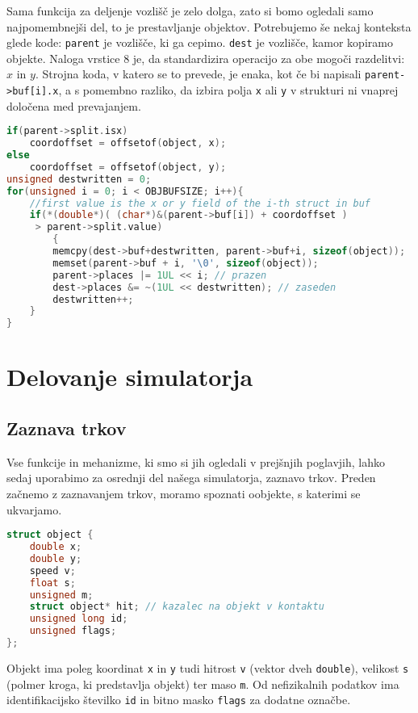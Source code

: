 \documentclass[a4paper,12pt]{article}
\begin{document}
Sama funkcija za deljenje vozlišč je zelo dolga, zato si bomo ogledali samo najpomembnejši
del, to je prestavljanje objektov. Potrebujemo še nekaj konteksta glede kode: \lstinline|parent|
je vozlišče, ki ga cepimo. \lstinline|dest| je vozlišče, kamor kopiramo objekte. Naloga vrstice
8 je, da standardizira operacijo za obe mogoči razdelitvi: $x$ in $y$. Strojna koda, v katero se to
prevede, je enaka, kot če bi napisali \lstinline|parent->buf[i].x|, a s pomembno razliko, da izbira
polja \lstinline|x| ali \lstinline|y| v strukturi ni vnaprej določena med prevajanjem.

\begin{lstlisting}[caption={Razdeljevanje objektov med potomcema}, label=balance_buffers, language=C]
if(parent->split.isx) 
    coordoffset = offsetof(object, x);
else 
    coordoffset = offsetof(object, y);
unsigned destwritten = 0;
for(unsigned i = 0; i < OBJBUFSIZE; i++){
    //first value is the x or y field of the i-th struct in buf
    if(*(double*)( (char*)&(parent->buf[i]) + coordoffset )
     > parent->split.value)
        {
        memcpy(dest->buf+destwritten, parent->buf+i, sizeof(object));
        memset(parent->buf + i, '\0', sizeof(object));
        parent->places |= 1UL << i; // prazen
        dest->places &= ~(1UL << destwritten); // zaseden
        destwritten++;
    }
}
\end{lstlisting}
\section{Delovanje simulatorja}
\subsection{Zaznava trkov}
Vse funkcije in mehanizme, ki smo si jih ogledali v prejšnjih poglavjih, lahko sedaj uporabimo
za osrednji del našega simulatorja, zaznavo trkov.
Preden začnemo z zaznavanjem trkov, moramo spoznati oobjekte, s katerimi se ukvarjamo.
\begin{lstlisting}[caption={Struktura objekta}, label=object_struct, language=C]
struct object {
    double x;
    double y;
    speed v;
    float s;
    unsigned m;
    struct object* hit; // kazalec na objekt v kontaktu
    unsigned long id;
    unsigned flags;
};
\end{lstlisting}
Objekt ima poleg koordinat \lstinline|x| in \lstinline|y| tudi hitrost \lstinline|v| (vektor dveh \lstinline|double|),
velikost \lstinline|s| (polmer kroga, ki predstavlja objekt) ter maso \lstinline|m|. Od nefizikalnih podatkov ima
identifikacijsko številko \lstinline|id| in bitno masko \lstinline|flags| za dodatne označbe.
\end{document}
